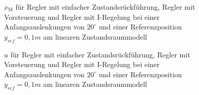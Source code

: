 \begin{figure}[H]
    \centering
    \caption[Reglervergleich für $x_{\mathrm{M}}$ (linear)]{$x_{\mathrm{M}}$ für Regler mit einfacher Zustandsrückführung, Regler mit Vorsteuerung und Regler mit I-Regelung bei einer Anfangsauslenkungen von $20^\circ$ und einer Referenzposition $y_{ref} = 0,1 m$ am linearen Zustandsraummodell}
    \label{fig:Bild26}
\end{figure}

\begin{figure}[H]
    \centering
    \caption[Reglervergleich für $u$ (linear)]{$u$ für Regler mit einfacher Zustandsrückführung, Regler mit Vorsteuerung und Regler mit I-Regelung bei einer Anfangsauslenkungen von $20^\circ$ und einer Referenzposition $y_{ref} = 0,1 m$ am linearen Zustandsraummodell}
    \label{fig:Bild27}
\end{figure}

